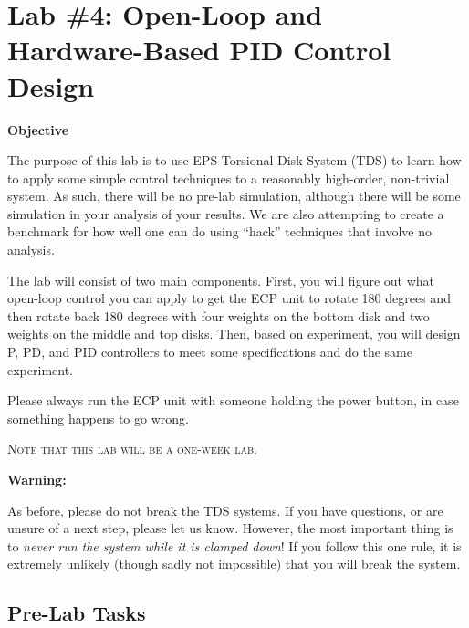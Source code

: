\pagestyle{fancy}
\fancyhf{}
\fancyfoot[C]{\vspace{.2in}\thepage}

\chapter{Lab \#4:  Open-Loop and Hardware-Based PID Control Design}
\date{}

\begin{center}  \textbf{Objective}
\end{center}

The purpose of this lab is to use EPS Torsional Disk System (TDS) to learn how
to apply some simple control techniques to a reasonably high-order, non-trivial
system.  As such, there will be no pre-lab simulation, although there will be some
simulation in your analysis of your results.  We are also attempting to create a
benchmark for how well one can do using ``hack'' techniques that involve no
analysis.

The lab will consist of two main components.  First, you will figure out what
open-loop control you can apply to get the ECP unit to rotate 180 degrees and
then rotate back 180 degrees with four weights on the bottom disk and two
weights on the middle and top disks. Then, based on experiment, you will design 
P, PD, and PID controllers to meet some specifications and do the same
experiment.  

Please always run the ECP unit with someone holding the power button, in case
something happens to go wrong.  

\vspace{.2in}

\begin{center} \textsc{Note that this lab will be a one-week lab.}
\end{center}

\begin{center} \textbf{Warning:} 
\end{center}

As before, please do not break the TDS systems.  If you have questions, or are
unsure of a next step, please let us know.  However, the most important thing is
to \emph{never run the system while it is clamped down}!  If you follow this one
rule, it is extremely unlikely (though sadly not impossible) that you will break
the system.


\newpage
\section{Pre-Lab Tasks}

